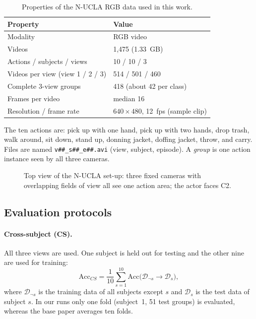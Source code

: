 \documentclass[runningheads]{llncs}
\begin{document}
\begin{table}[t]
\caption{Properties of the N-UCLA RGB data used in this work.}\label{tab:dataset}
\centering
\small
\begin{tabular}{ll}
\toprule
Property & Value \\
\midrule
Modality & RGB video \\
Videos & 1{,}475 (1.33~GB) \\
Actions / subjects / views & 10 / 10 / 3 \\
Videos per view (view 1 / 2 / 3) & 514 / 501 / 460 \\
Complete 3-view groups & 418 (about 42 per class) \\
Frames per video & median 16 \\
Resolution / frame rate & $640{\times}480$, 12~fps (sample clip) \\
\bottomrule
\end{tabular}
\end{table}

The ten actions are: pick up with one hand, pick up with two hands, drop trash, walk around, sit down, stand up, donning jacket, doffing jacket, throw, and carry. Files are named \texttt{v\#\#\_s\#\#\_e\#\#.avi} (view, subject, episode). A \emph{group} is one action instance seen by all three cameras.

\begin{figure}[t]
\centering
{}
\caption{Top view of the N-UCLA set-up: three fixed cameras with overlapping fields of view all see one action area; the actor faces C2.}\label{fig:cameras}
\end{figure}

\subsection{Evaluation protocols}
\paragraph{Cross-subject (CS).} All three views are used. One subject is held out for testing and the other nine are used for training:
\begin{equation}
\mathrm{Acc}_{CS}=\frac{1}{10}\sum_{s=1}^{10}\mathrm{Acc}\big(\mathcal{D}_{\neg s}\rightarrow\mathcal{D}_{s}\big),
\end{equation}
where $\mathcal{D}_{\neg s}$ is the training data of all subjects except $s$ and $\mathcal{D}_s$ is the test data of subject $s$. In our runs only one fold (subject~1, 51 test groups) is evaluated, whereas the base paper averages ten folds.
\end{document}
